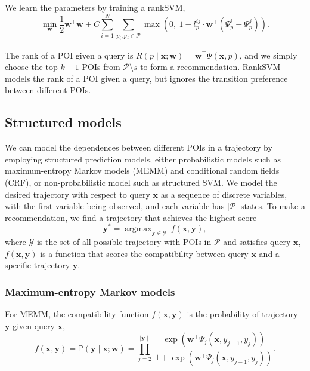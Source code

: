 \documentclass[twocolumn,9pt]{extarticle}
\DeclareMathOperator*{\argmax}{argmax}
\begin{document}
We learn the parameters by training a rankSVM,
\begin{equation*}
\min_{\mathbf{w}} \frac{1}{2} \mathbf{w}^\top \mathbf{w} +  
C \sum_{i=1}^N \sum_{p_i, p_j \in \mathcal{P}} \max\left(0,~ 1 - l_p^{ij} \cdot \mathbf{w}^\top \left( \Psi_p^i - \Psi_p^j \right) \right).
\end{equation*}

The rank of a POI given a query is $R(p \mid \mathbf{x}; \mathbf{w}) = \mathbf{w}^\top \Psi(\mathbf{x}, p)$,
and we simply choose the top $k-1$ POIs from $\mathcal{P} \setminus s$ to form a recommendation.
RankSVM models the rank of a POI given a query, but ignores the transition preference between different POIs.



\subsection{Structured models}
\label{sec:structured}

We can model the dependences between different POIs in a trajectory by employing structured prediction models,
either probabilistic models such as maximum-entropy Markov models (MEMM) and conditional random fields (CRF),
or non-probabilistic model such as structured SVM.
We model the desired trajectory with respect to query $\mathbf{x}$ as a sequence of discrete variables, 
with the first variable being observed, and each variable has $|\mathcal{P}|$ states.
To make a recommendation, we find a trajectory that achieves the highest score
\begin{equation*}
\mathbf{y}^* = \argmax_{\mathbf{y} \in \mathcal{Y}}~ f(\mathbf{x}, \mathbf{y}),
\end{equation*}
where $\mathcal{Y}$ is the set of all possible trajectory with POIs in $\mathcal{P}$ and satisfies query $\mathbf{x}$,
$f(\mathbf{x}, \mathbf{y})$ is a function that scores the compatibility between query $\mathbf{x}$ and a specific trajectory $\mathbf{y}$.



\subsubsection{Maximum-entropy Markov models}
\label{sec:memm}

For MEMM, the compatibility function $f(\mathbf{x}, \mathbf{y})$ is the probability of trajectory $\mathbf{y}$ given query $\mathbf{x}$,
\begin{equation*}
f(\mathbf{x}, \mathbf{y}) = \mathbb{P}(\mathbf{y} \mid \mathbf{x}; \mathbf{w}) 
                          = \prod_{j=2}^{\mid \mathbf{y} \mid}~
                            \frac{\exp \left(\mathbf{w}^\top \Psi_j(\mathbf{x}, y_{j-1}, y_j) \right)}
                                 {1 + \exp \left(\mathbf{w}^\top \Psi_j(\mathbf{x}, y_{j-1}, y_j) \right)}.
\end{equation*}
\end{document}
